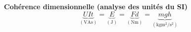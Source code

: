 \documentclass[a4paper,10pt,landscape]{article}
\begin{document}
\begin{center}
\begin{tcolorbox}[cheatbox, colback=graybg, width=0.97\textwidth]
\centering
\textbf{Cohérence dimensionnelle (analyse des unités du SI)}
\[
\underbrace{U I t}_{(\si{\volt\ampere\second})} =
\underbrace{E}_{(\si{\joule})} =
\underbrace{F d}_{(\si{\newton\metre})} =
\underbrace{m g h}_{(\si{\kilo\gram\metre\squared\per\second\squared})}
\]

\end{tcolorbox}
\end{center}
\end{document}

